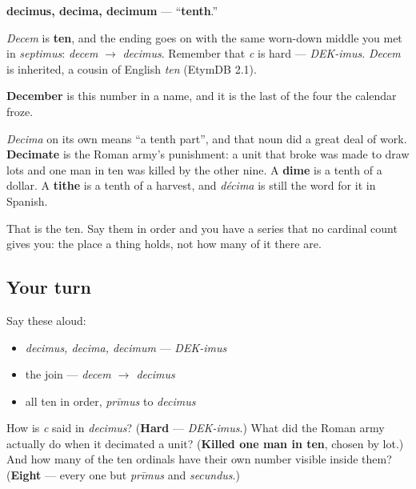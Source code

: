 \begin{cousinweb}
\textbf{decimus, decima, decimum} — \textquotedblleft{}\textbf{tenth}.\textquotedblright{}

\emph{Decem} is \textbf{ten}, and the ending goes on with the same worn-down middle you met in \emph{septimus}: \emph{decem} $\to$ \emph{decimus}. Remember that \emph{c} is hard — \emph{DEK-imus}. \emph{Decem} is inherited, a cousin of English \emph{ten} (EtymDB 2.1).

\textbf{December} is this number in a name, and it is the last of the four the calendar froze.

\emph{Decima} on its own means \textquotedblleft{}a tenth part\textquotedblright{}, and that noun did a great deal of work. \textbf{Decimate} is the Roman army's punishment: a unit that broke was made to draw lots and one man in ten was killed by the other nine. A \textbf{dime} is a tenth of a dollar. A \textbf{tithe} is a tenth of a harvest, and \emph{décima} is still the word for it in Spanish.

That is the ten. Say them in order and you have a series that no cardinal count gives you: the place a thing holds, not how many of it there are.
\end{cousinweb}

\subsection*{Your turn}
Say these aloud:

\begin{itemize}
\raggedright
  \item \emph{decimus, decima, decimum} — \emph{DEK-imus}
  \item the join — \emph{decem $\to$ decimus}
  \item all ten in order, \emph{prīmus} to \emph{decimus}
\end{itemize}

\begin{tcolorbox}[breakable,colback=teal!4,colframe=teal!35!black,title={Before you move on}]
How is \emph{c} said in \emph{decimus}? (\textbf{Hard} — \emph{DEK-imus}.) What did the Roman army actually do when it decimated a unit? (\textbf{Killed one man in ten}, chosen by lot.) And how many of the ten ordinals have their own number visible inside them? (\textbf{Eight} — every one but \emph{prīmus} and \emph{secundus}.)
\end{tcolorbox}
